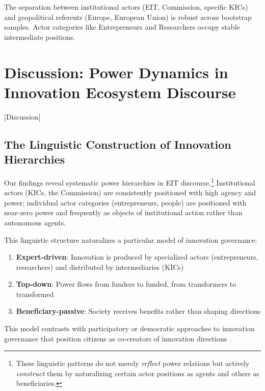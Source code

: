 \documentclass[../main.tex]{subfiles}
\begin{document}
The separation between institutional actors (EIT, Commission, specific KICs) and geopolitical referents (Europe, European Union) is robust across bootstrap samples. Actor categories like Entrepreneurs and Researchers occupy stable intermediate positions.

\section{Discussion: Power Dynamics in Innovation Ecosystem Discourse}[Discussion]

\subsection{The Linguistic Construction of Innovation Hierarchies}

Our findings reveal systematic power hierarchies in EIT discourse.\footnote{These linguistic patterns do not merely \textit{reflect} power relations but actively \textit{construct} them by naturalizing certain actor positions as agents and others as beneficiaries.} Institutional actors (KICs, the Commission) are consistently positioned with high agency and power; individual actor categories (entrepreneurs, people) are positioned with near-zero power and frequently as objects of institutional action rather than autonomous agents.

This linguistic structure naturalizes a particular model of innovation governance:

\begin{enumerate}
    \item \textbf{Expert-driven}: Innovation is produced by specialized actors (entrepreneurs, researchers) and distributed by intermediaries (KICs)
    \item \textbf{Top-down}: Power flows from funders to funded, from transformers to transformed
    \item \textbf{Beneficiary-passive}: Society receives benefits rather than shaping directions
\end{enumerate}

This model contrasts with participatory or democratic approaches to innovation governance that position citizens as co-creators of innovation directions \cite{stilgoe2013developing}.
\end{document}
